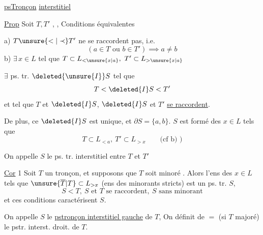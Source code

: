 \uline{psTronçon} \uline{interstitiel}

\uline{Prop} Soit $T,T'$ , , Conditions équivalentes  

a) $T\unsure{<|\prec}T'$  ne se raccordent pas, i.e.
\[
(a\in T\text{ ou }b\in T')\implies a\neq b
\]
\quad b) $\exists\,x\in L$ tel que $T\subset L_{<\unsure{x|a}},\ T'\subset L_{>\unsure{x|a}}$

 $\exists$ ps. tr. $\deleted{\unsure{I}}S$ tel que
\[
T<\deleted{I}S<T'
\]
et tel que $T$ et $\deleted{I}S$, $\deleted{I}S$ et $T'$ \uline{se raccordent}.

De plus, ce $\deleted{I}S$ est unique, et $\partial S=\{a,b\}$. $S$ est formé des $x\in L$ tels que
\[
T\subset L_{<a},\ T'\subset L_{>x}\qquad\text{(cf b) )}
\]

On appelle $S$ le ps. tr. interstitiel entre $T$ et $T'$

\uline{Cor} 1 Soit $T$ un tronçon, et supposons que $T$ soit minoré . Alors l'ens des   $x\in L$ tels que $\unsure{\overline T|T}\subset L_{>x}$ (ens des minorants stricts) est un  ps. tr. $S$,  
\begingroup
\makeatletter
\tagsleft@true
\makeatother
\[
S<T,\ S\text{ et }T\text{ se raccordent},\ S\text{ sans minorant}\tag*{\(\ast\))}
\]
\endgroup
et ces conditions  caractérisent $S$.

 On appelle $S$ le \uline{pstronçon interstitiel gauche} de $T$, On définit de $=$ (si $T$ majoré) le pstr. interst. droit. de $T$.
